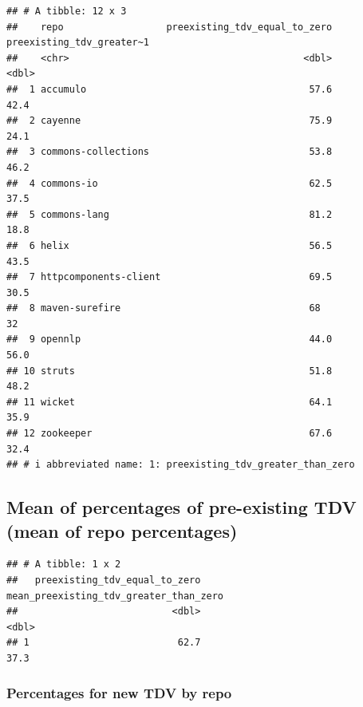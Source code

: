 \documentclass[
]{article}
\begin{document}
\begin{verbatim}
## # A tibble: 12 x 3
##    repo                  preexisting_tdv_equal_to_zero preexisting_tdv_greater~1
##    <chr>                                         <dbl>                     <dbl>
##  1 accumulo                                       57.6                      42.4
##  2 cayenne                                        75.9                      24.1
##  3 commons-collections                            53.8                      46.2
##  4 commons-io                                     62.5                      37.5
##  5 commons-lang                                   81.2                      18.8
##  6 helix                                          56.5                      43.5
##  7 httpcomponents-client                          69.5                      30.5
##  8 maven-surefire                                 68                        32  
##  9 opennlp                                        44.0                      56.0
## 10 struts                                         51.8                      48.2
## 11 wicket                                         64.1                      35.9
## 12 zookeeper                                      67.6                      32.4
## # i abbreviated name: 1: preexisting_tdv_greater_than_zero
\end{verbatim}

\subsection{Mean of percentages of pre-existing TDV (mean of repo
percentages)}\label{mean-of-percentages-of-pre-existing-tdv-mean-of-repo-percentages}

\begin{verbatim}
## # A tibble: 1 x 2
##   preexisting_tdv_equal_to_zero mean_preexisting_tdv_greater_than_zero
##                           <dbl>                                  <dbl>
## 1                          62.7                                   37.3
\end{verbatim}

\subsubsection{Percentages for new TDV by
repo}\label{percentages-for-new-tdv-by-repo}
\end{document}
